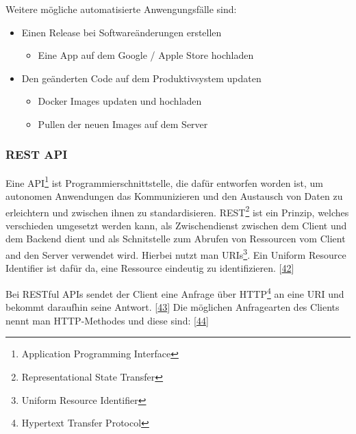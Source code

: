 \documentclass[
    headings=optiontotocandhead,%
    twoside,
    numbers=noenddot,%
    12pt, %
    titlepage, %
    parskip=full, %
    listof=leveldown, 
    numbers=noenddot, %
    a4paper,DIV=14,
    BCOR=15mm,
]{scrbook}
\providecommand{\tightlist}{%
  \setlength{\itemsep}{0pt}\setlength{\parskip}{0pt}}
\begin{document}
Weitere mögliche automatisierte Anwengungsfälle sind:

\begin{itemize}
\tightlist
\item
  Einen Release bei Softwareänderungen erstellen

  \begin{itemize}
  \tightlist
  \item
    Eine App auf dem Google / Apple Store hochladen
  \end{itemize}
\item
  Den geänderten Code auf dem Produktivsystem updaten

  \begin{itemize}
  \tightlist
  \item
    Docker Images updaten und hochladen
  \item
    Pullen der neuen Images auf dem Server
  \end{itemize}
\end{itemize}

\hypertarget{rest-api}{%
\subsubsection{REST API}\label{rest-api}}

Eine API\footnote{Application Programming Interface} ist
Programmierschnittstelle, die dafür entworfen worden ist, um autonomen
Anwendungen das Kommunizieren und den Austausch von Daten zu erleichtern
und zwischen ihnen zu standardisieren. REST\footnote{Representational
  State Transfer} ist ein Prinzip, welches verschieden umgesetzt werden
kann, als Zwischendienst zwischen dem Client und dem Backend dient und
als Schnitstelle zum Abrufen von Ressourcen vom Client and den Server
verwendet wird. Hierbei nutzt man URIs\footnote{Uniform Resource
  Identifier}. Ein Uniform Resource Identifier ist dafür da, eine
Ressource eindeutig zu identifizieren.
{[}\protect\hyperlink{ref-REST-API-Design-Rulebook}{42}{]}

Bei RESTful APIs sendet der Client eine Anfrage über HTTP\footnote{Hypertext
  Transfer Protocol} an eine URI und bekommt daraufhin seine Antwort.
{[}\protect\hyperlink{ref-redhat-rest}{43}{]} Die möglichen Anfragearten
des Clients nennt man HTTP-Methodes und diese sind:
{[}\protect\hyperlink{ref-mozilla-rest}{44}{]}
\end{document}
